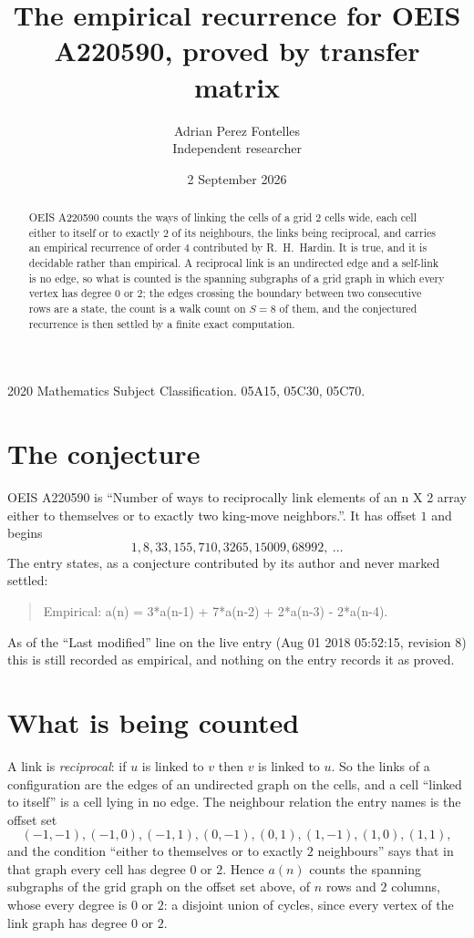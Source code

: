 \documentclass[11pt,a4paper]{article}
\title{The empirical recurrence for OEIS A220590, proved by transfer matrix}
\author{Adrian Perez Fontelles\\ \small Independent researcher}
\date{2 September 2026}
\theoremstyle{plain}
\theoremstyle{definition}
\begin{document}
\maketitle

\begin{abstract}
OEIS A220590 counts the ways of linking the cells of a grid $2$ cells wide, each cell either to
itself or to exactly $2$ of its neighbours, the links being reciprocal, and carries an
empirical recurrence of order $4$ contributed by R.~H.~Hardin. It is true, and it is
decidable rather than empirical. A reciprocal link is an undirected edge and a self-link is
no edge, so what is counted is the spanning subgraphs of a grid graph in which every vertex
has degree $0$ or $2$; the edges crossing the boundary between two consecutive rows are a
state, the count is a walk count on $S=8$ of them, and the conjectured recurrence is then
settled by a finite exact computation.
\end{abstract}

\noindent\small 2020 Mathematics Subject Classification. 05A15, 05C30, 05C70.\normalsize

\section{The conjecture}

OEIS A220590 is ``Number of ways to reciprocally link elements of an n X 2 array either to themselves or to exactly two king-move neighbors.''. It has offset $1$ and begins
\[
1, 8, 33, 155, 710, 3265, 15009, 68992,\ \dots
\]
The entry states, as a conjecture contributed by its author and never marked settled:
\begin{quote}
Empirical: a(n) = 3*a(n-1) + 7*a(n-2) + 2*a(n-3) - 2*a(n-4).
\end{quote}
As of the ``Last modified'' line on the live entry (Aug 01 2018 05:52:15, revision 8) this is still
recorded as empirical, and nothing on the entry records it as proved.

\section{What is being counted}

A link is \emph{reciprocal}: if $u$ is linked to $v$ then $v$ is linked to $u$. So the links
of a configuration are the edges of an undirected graph on the cells, and a cell ``linked to
itself'' is a cell lying in no edge. The neighbour relation the entry names is the offset set
\[
(-1,-1), (-1,0), (-1,1), (0,-1), (0,1), (1,-1), (1,0), (1,1),
\]
and the condition ``either to themselves or to exactly $2$ neighbours'' says that in that
graph every cell has degree $0$ or $2$. Hence $a(n)$ counts the spanning subgraphs of the
grid graph on the offset set above, of $n$ rows and $2$ columns,
whose every degree is $0$ or $2$: a disjoint union of cycles, since every vertex of the link graph has degree $0$ or $2$.
\end{document}
